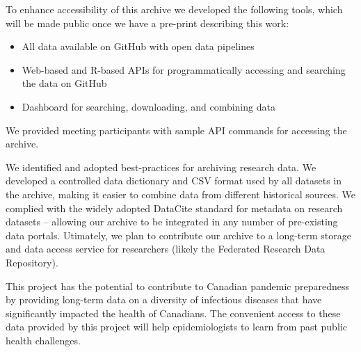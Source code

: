 To enhance accessibility of this archive we developed the following tools, which will be made public once we have a pre-print describing this work:

\begin{itemize}
  \item All data available on GitHub with open data pipelines
  \item Web-based and R-based APIs for programmatically accessing and searching the data on GitHub
  \item Dashboard for searching, downloading, and combining data
\end{itemize}

We provided meeting participants with sample API commands for accessing the archive.

We identified and adopted best-practices for archiving research data. We developed a controlled data dictionary and CSV format used by all datasets in the archive, making it easier to combine data from different historical sources. We complied with the widely adopted DataCite standard for metadata on research datasets -- allowing our archive to be integrated in any number of pre-existing data portals. Utimately, we plan to contribute our archive to a long-term storage and data access service for researchers (likely the Federated Research Data Repository).

This project has the potential to contribute to Canadian pandemic preparedness by providing long-term data on a diversity of infectious diseases that have significantly impacted the health of Canadians. The convenient access to these data provided by this project will help epidemiologists to learn from past public health challenges.